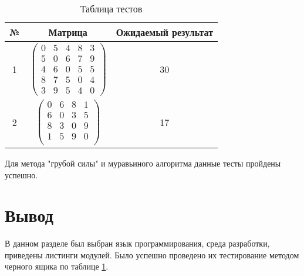 \begin{table}[ht!]
	\centering
	\captionsetup{singlelinecheck = false, justification=raggedright}
	\caption{Таблица тестов}
	\label{table:ref1}
	\begin{tabular}{|c|c|c|}
		\hline
		№ & Матрица  &    Ожидаемый результат\\\hline
		1 & $\begin{pmatrix}
			0 & 5 & 4 & 8 & 3 \\
			5 & 0 & 6 & 7 & 9 \\
			4 & 6 & 0 & 5 & 5 \\
			8 & 7 & 5 & 0 & 4 \\
			3 & 9 & 5 & 4 & 0 
			\end{pmatrix}$				 & 30
		\\ \hline
		2 & $\begin{pmatrix}
			0 & 6 & 8 & 1 \\
			6 & 0 & 3 & 5 \\
			8 & 3 & 0 & 9 \\
			1 & 5 & 9 & 0 \\
		\end{pmatrix}$	 				& 17
		\\ \hline
	\end{tabular}
\end{table}
	Для метода "грубой силы" и муравьиного алгоритма данные тесты пройдены успешно.
	
\section{Вывод}
В данном разделе был выбран язык программирования, среда разработки, приведены листинги модулей. Было успешно проведено их тестирование методом черного ящика по таблице \ref{table:ref1}. 

